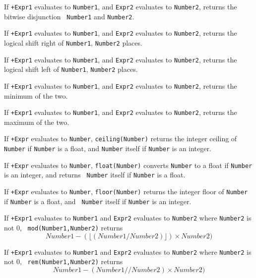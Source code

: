 \begin{description}
 If {\tt +Expr1} evaluates to {\tt Number1}, and {\tt Expr2}
evaluates to {\tt Number2}, returns the bitwise disjunction {\tt
Number1} and {\tt Number2}.

 If {\tt +Expr1} evaluates to {\tt Number1}, and {\tt Expr2}
evaluates to {\tt Number2}, returns the logical shift right of 
{\tt Number1}, {\tt Number2} places.

 If {\tt +Expr1} evaluates to {\tt Number1}, and {\tt Expr2}
evaluates to {\tt Number2}, returns the logical shift left of 
{\tt Number1}, {\tt Number2} places.

 If {\tt +Expr1} evaluates to {\tt Number1}, and
{\tt Expr2} evaluates to {\tt Number2}, returns the minimum of the
two.

 If {\tt +Expr1} evaluates to {\tt Number1}, and
{\tt Expr2} evaluates to {\tt Number2}, returns the maximum of the
two.

If {\tt +Expr} evaluates to {\tt Number}, {\tt ceiling(Number)}
returns the integer ceiling of {\tt Number} if {\tt Number} is a
float, and {\tt Number} itself if {\tt Number} is an integer.

 If
{\tt +Expr} evaluates to {\tt Number}, {\tt float(Number)} converts 
{\tt Number} to a float if {\tt Number} is an integer, and returns {\tt
Number} itself if {\tt Number} is a float.

 If
{\tt +Expr} evaluates to {\tt Number}, {\tt floor(Number)} returns the
integer floor of {\tt Number} if {\tt Number} is a float, and {\tt
Number} itself if {\tt Number} is an integer.

If {\tt +Expr1} evaluates to {\tt Number1} and {\tt Expr2} evaluates
to {\tt Number2} where {\tt Number2} is not 0, {\tt
mod(Number1,Number2)} returns
\[
	Number1 - (\lfloor (Number1 / Number2) \rfloor) \times Number2)
\]

If {\tt +Expr1} evaluates to {\tt Number1} and {\tt Expr2} evaluates
to {\tt Number2} where {\tt Number2} is not 0, {\tt
rem(Number1,Number2)} returns
\[
	Number1 - ({Number1} // {Number2}) \times Number2)
\]


\end{description}
